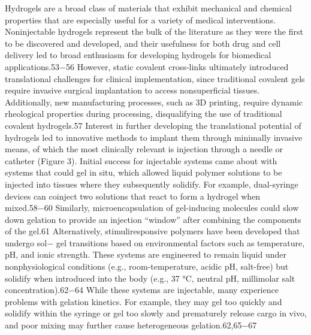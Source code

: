 \documentclass[../../main-notes.tex]{subfiles}
\begin{document}
Hydrogels are a broad class of materials that exhibit mechanical and chemical properties that are especially useful for a variety of medical interventions. 
Noninjectable hydrogels represent the bulk of the literature as they were the first to be discovered and developed, and their usefulness for both drug and cell delivery led to broad enthusiasm for developing hydrogels for biomedical applications.53−56  
However, static covalent cross-links ultimately introduced translational challenges for clinical implementation, since traditional covalent gels require invasive surgical implantation to access nonsuperficial tissues.  
Additionally, new manufacturing processes, such as 3D printing, require dynamic rheological properties during processing, disqualifying the use of traditional covalent  hydrogels.57  
Interest in further developing the translational potential of hydrogels led to innovative methods to implant them through minimally invasive means, of which the most clinically relevant is injection through a needle or catheter (Figure 3).  
Initial success for injectable systems came about with systems that could gel in situ, which allowed liquid polymer solutions to be injected into tissues where they subsequently solidify.  
For example, dual-syringe devices can coinject two  solutions that react to form a hydrogel when mixed.58−60  
Similarly, microencapsulation of gel-inducing molecules could slow down gelation to provide an injection “window” after  combining the components of the gel.61  
Alternatively, stimuliresponsive polymers have been developed that undergo sol− gel transitions based on environmental factors such as temperature, pH, and ionic strength.  
These systems are engineered to remain liquid under nonphysiological conditions (e.g., room-temperature, acidic pH, salt-free) but solidify when introduced into the body (e.g., 37 °C, neutral pH, millimolar  salt concentration).62−64  
While these systems are injectable, many experience problems with gelation kinetics.  
For example, they may gel too quickly and solidify within the syringe or gel too slowly and prematurely release cargo in vivo, and poor  mixing may further cause heterogeneous gelation.62,65−67
\end{document}
